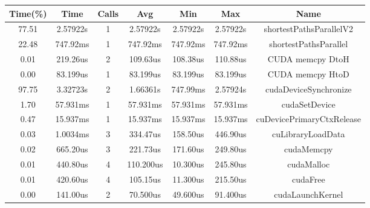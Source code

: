 \documentclass[
	a4paper, %
	12pt, %
]{class}
\begin{document}
\begin{center}
    \begin{adjustbox}{width=1\textwidth}
        \begin{tabular}{ |c|c|c|c|c|c|c| }
            \hline
            \textbf{Time(\%)}  & \textbf{Time}  & \textbf{Calls} & \textbf{Avg}  & \textbf{Min} & \textbf{Max}  & \textbf{Name}       \\ \hline
            77.51     & 2.57922s  &   1   &   2.57922s    &  2.57922s  &  2.57922s &  shortestPathsParallelV2                             \\ \hline
            22.48     & 747.92ms  &   1   &   747.92ms    &  747.92ms  &  747.92ms &  shortestPathsParallel                               \\ \hline
            0.01      & 219.26us  &   2   &   109.63us    &  108.38us  &  110.88us &  CUDA memcpy DtoH                                    \\ \hline
            0.00      & 83.199us  &   1   &   83.199us    &  83.199us  &  83.199us &  CUDA memcpy HtoD                                    \\ \hline
            97.75     & 3.32723s  &   2   &   1.66361s    &  747.99ms  &  2.57924s &  cudaDeviceSynchronize                               \\ \hline
            1.70      & 57.931ms  &   1   &   57.931ms    &  57.931ms  &  57.931ms &  cudaSetDevice                                       \\ \hline
            0.47      & 15.937ms  &   1   &   15.937ms    &  15.937ms  &  15.937ms &  cuDevicePrimaryCtxRelease                           \\ \hline
            0.03      & 1.0034ms  &   3   &   334.47us    &   158.50us &  446.90us &  cuLibraryLoadData                                   \\ \hline
            0.02      & 665.20us  &   3   &   221.73us    &  171.60us  &  249.80us &  cudaMemcpy                                          \\ \hline
            0.01      & 440.80us  &   4   &   110.200us   &  10.300us  &  245.80us &  cudaMalloc                                          \\ \hline
            0.01      & 420.60us  &   4   &   105.15us    &  11.300us  &  215.50us &  cudaFree                                            \\ \hline
            0.00      & 141.00us  &   2   &   70.500us    &  49.600us  &  91.400us &  cudaLaunchKernel                                    \\ \hline

\end{tabular}
\end{adjustbox}
\end{center}
\end{document}
